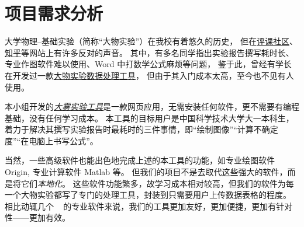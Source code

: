 \section{项目需求分析}

大学物理--基础实验（简称“大物实验”）在我校有着悠久的历史，
但在\href{https://icourse.club/course/12716/}{评课社区}、\href{https://www.zhihu.com/question/35867101}{知乎}等网站上有许多反对的声音。
其中，有多名同学指出实验报告撰写耗时长、专业作图软件难以使用、Word 中打数学公式麻烦等问题，
鉴于此，曾经有学长在开发过一款\href{https://github.com/regymm/PhysicsExp}{大物实验数据处理工具}，
但由于其入门成本太高，至今也不见有人使用。

本小组开发的\href{http://home.ustc.edu.cn/~sunxulei/dawu/}{\emph{大雾实验工具}}是一款网页应用，无需安装任何软件，更不需要有编程基础，没有任何学习成本。
本工具的目标用户是中国科学技术大学大一本科生，着力于解决其撰写实验报告时最耗时的三件事情，即“绘制图像”“计算不确定度”“在电脑上书写公式”。

当然，一些高级软件也能出色地完成上述的本工具的功能，如专业绘图软件 Origin, 专业计算软件 Matlab 等。
但我们的项目不是去取代这些强大的软件，而是将它们\emph{本地化}。
这些软件功能繁多，故学习成本相对较高，但我们的软件为每一个大物实验都写了专门的处理工具，封装到只需要用户上传数据表格的程度。
相比动辄几个 \unit{\giga\byte} 的专业软件来说，我们的工具更加友好，更加便捷，更加有针对性——更加有效。